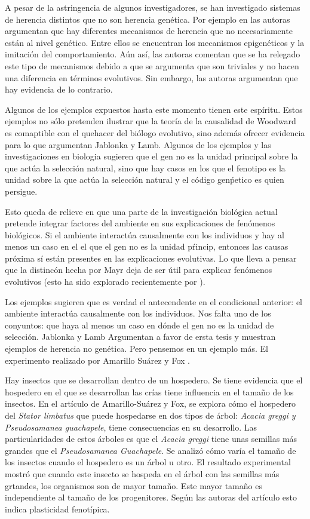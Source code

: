 A pesar de la astringencia de algunos investigadores, se han investigado sistemas de herencia distintos que no son herencia genética. Por ejemplo en \cite{Jablonka2020} las autoras argumentan que hay diferentes mecanismos de herencia que no necesariamente están al nivel genético. Entre ellos se encuentran los mecanismos epigenéticos y la imitación del comportamiento. Aún así, las autoras comentan que se ha relegado este tipo de mecanismos debido a que se argumenta que son triviales y no hacen una diferencia en términos evolutivos. Sin embargo, las autoras argumentan que hay evidencia de lo contrario.

Algunos de los ejemplos expuestos hasta este momento tienen este espíritu. Estos ejemplos no sólo pretenden ilustrar que la teoría de la causalidad de Woodward es comaptible con el quehacer del biólogo evolutivo, sino además ofrecer evidencia para lo que argumentan Jablonka y Lamb. Algunos de los ejemplos y las investigaciones en biologia sugieren que el gen no es la unidad principal sobre la que actúa la selección natural, sino que hay casos en los que el fenotipo es la unidad sobre la que actúa la selección natural y el código genṕetico es quien persigue.

Esto queda de relieve en que una parte de la investigación biológica actual pretende integrar factores del ambiente en sus explicaciones de fenómenos biológicos. Si el ambiente interactúa causalmente con los individuos y hay al menos un caso en el el que el gen no es la unidad pŕincip, entonces las causas próxima sí están presentes en las explicaciones evolutivas. Lo que lleva a pensar que la distincón hecha por Mayr deja de ser útil para explicar fenómenos evolutivos (esto ha sido explorado recientemente por \cite{Uller2020, Dayan2020, Laland2011}).

Los ejemplos sugieren que es verdad el antecendente en el condicional anterior: el ambiente interactúa causalmente con los individuos. Nos falta uno de los conyuntos: que haya al menos un caso en dónde el gen no es la unidad de selección. Jablonka y Lamb Argumentan a favor de ersta tesis y muestran ejemplos de herencia no genética. Pero pensemos en un  ejemplo más. El experimento realizado por Amarillo Suárez y Fox \citeyear{Amarillo-Suarez2006}.

Hay insectos que se desarrollan dentro de un hospedero. Se tiene evidencia que el hospedero en el que se desarrollan las crías tiene influencia en el tamaño de los insectos. En el artículo de Amarillo-Suárez y Fox, se explora cómo el hospedero del \emph{Stator limbatus} que puede hospedarse en dos tipos de árbol: \emph{Acacia greggi y Pseudosamanea guachapele}, tiene consecuencias en su desarrollo. Las particularidades de estos árboles es que el \emph{Acacia greggi} tiene unas semillas más grandes que el \emph{Pseudosamanea Guachapele}. Se analizó cómo varía el tamaño de los insectos cuando el hospedero es un árbol u otro. El resultado experimental mostró que cuando este insecto se hospeda en el árbol con las semillas más grtandes, los organismos son de mayor tamaño. Este mayor tamaño es independiente al tamaño de los progenitores. Según las autoras del artículo esto indica plasticidad fenotípica.

